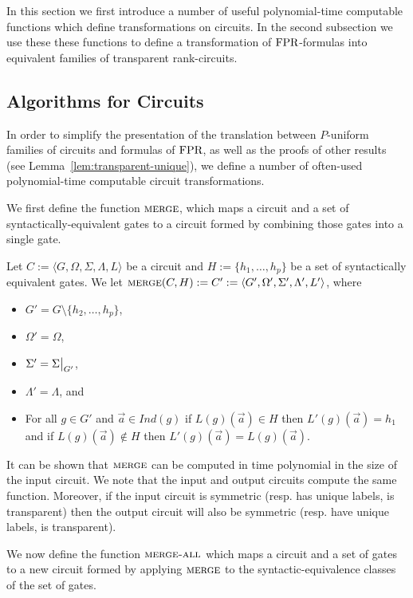 \documentclass[../paper.tex]{subfiles}
\begin{document}
In this section we first introduce a number of useful polynomial-time computable
functions which define transformations on circuits. In the second subsection we
use these these functions to define a transformation of $\text{\upshape FPR}$-formulas into
equivalent families of transparent rank-circuits.

\subsection{Algorithms for Circuits}
In order to simplify the presentation of the translation between $P$-uniform
families of circuits and formulas of $\text{\upshape FPR}$, as well as the proofs of other
results (see Lemma~\ref{lem:transparent-unique}), we define a number of
often-used polynomial-time computable circuit transformations.

We first define the function ${\normalfont\textsc{merge}}$, which maps a circuit and a set of
syntactically-equivalent gates to a circuit formed by combining those gates into
a single gate.

\begin{definition}
  Let $C := \langle G, \Omega, \Sigma , \Lambda, L \rangle$ be a circuit and $H
  := \{h_1, \ldots, h_p\}$ be a set of syntactically equivalent gates. We let
  ${\normalfont\textsc{merge}}(C, H) := C' := \langle G', \Omega', \Sigma', \Lambda', L'
  \rangle$, where
  \begin{itemize}
    \setlength\itemsep{0mm}
  \item $G' = G \setminus \{h_2, \ldots, h_p\}$,
  \item $\Omega' = \Omega$,
  \item $\Sigma' = \restr{\Sigma}{G'}$,
  \item $\Lambda' = \Lambda$, and
  \item For all $g \in G'$ and $\vec{a} \in Ind(g)$ if $L(g) (\vec{a}) \in H$
    then $L'(g)(\vec{a}) = h_1$ and if $L(g)(\vec{a}) \notin H$ then
    $L'(g)(\vec{a}) = L(g)(\vec{a})$.
  \end{itemize}
\end{definition}

It can be shown that ${\normalfont\textsc{merge}}$ can be computed in time polynomial in the size
of the input circuit. We note that the input and output circuits compute the
same function. Moreover, if the input circuit is symmetric (resp. has unique
labels, is transparent) then the output circuit will also be symmetric (resp.
have unique labels, is transparent).

We now define the function ${\normalfont\textsc{merge-all}}$ which maps a circuit and a set of
gates to a new circuit formed by applying ${\normalfont\textsc{merge}}$ to the
syntactic-equivalence classes of the set of gates.
\end{document}
